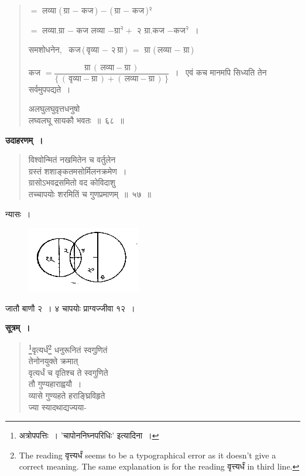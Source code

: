 \documentclass[11pt, openany]{book}
\begin{document}
\begin{quote}
{\hspace{10mm} $=$ लव्या (\,ग्रा $-$ कज\,) $-$ (\,ग्रा $-$ कज\,)$^{\text{२}}$
\vspace{1mm}

\hspace{10mm} $=$ लव्या.ग्रा $-$ कज लव्या $- \mbox{ग्रा}^{\text{२}} +$ २ ग्रा.कज $- \mbox{कज}^{\text{२}}$~। 
\vspace{1mm}

\hspace{2mm} समशोधनेन,~ कज\,(\,वृव्या $-$ २\,ग्रा\,) $=$ ग्रा (\,लव्या $-$ ग्रा\,)
\vspace{1mm}

\hspace{4mm} कज $= \dfrac{\mbox{ग्रा}\,(\,\mbox{लव्या} - \mbox{ग्रा}\,)}{\{\,(\,\mbox{वृव्या} - \mbox{ग्रा}\,) + (\,\mbox{लव्या} - \mbox{ग्रा}\,)\,\}}$~।~ एवं कच मानमपि सिध्यति तेन सर्वमुपपद्यते~।}अलघुलघुवृत्तधनुषो \\
लघ्वलघू सायकौ भवतः~॥~६८~॥
\end{quote}

\newpage
 \textbf{उदाहरणम्~।} 
\begin{quote}
    \bqt 
    विश्वोन्मितं नखमितेन च वर्तुलेन \\
    ग्रस्तं शशाङ्कतमसोर्मिलनक्रमेण~।\\
ग्रासोऽभवद्रसमितो वद कोविदाशु \\
तच्चापयोः शरमितिं च गुणप्रमाणम्~॥~५७~॥
\end{quote}

 न्यासः~। 
\vspace{-2mm}

\begin{figure}[h!]
    \centering
    \includegraphics[scale=0.85]{graphics/capture81.png}
\end{figure}
\vspace{-2mm}

 जातौ बाणौ २~। ४ चापयोः प्राग्वज्जीवा १२~। \\
\setcounter{footnote}{0}

 \textbf{सूत्रम्~।} 
\begin{quote}
    \bs 
     \footnote{अत्रोपपत्तिः~। {\color{violet}'चापोननिघ्नपरिधिः'} इत्यादिना~।}वृत्यर्धं\footnote{The reading वृत्त्यर्धं seems to be a typographical error as it doesn't give a correct meaning. The same explanation is for the reading वृत्त्यर्धं in third line.} धनुरूनितं स्वगुणितं \\
     तेनोनयुक्ते क्रमात् \\
वृत्यर्धं च वृतिश्च ते स्वगुणिते \\
तौ गुण्यहाराह्वयौ~।\\
व्यासे गुण्यहते हराङ्घ्रिविहृते \\
ज्या स्यादथाद्यज्यया-
\end{quote}
\end{document}
